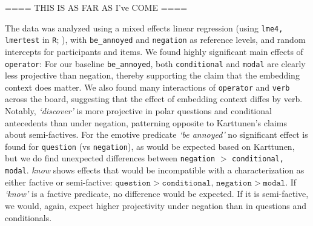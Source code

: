 \documentclass[12pt, a4paper]{scrartcl}
\begin{document}
==== THIS IS AS FAR AS I've COME ====


	\noindent The data was analyzed using a mixed effects linear regression (using \texttt{lme4, lmertest} in \texttt{R}; \citealp{bates_fitting_2015,kuznetsova_lmertest_2016,r_core_team_r_2014}), with \texttt{be\_annoyed} and \texttt{negation} as reference levels, and random intercepts for participants and items.
	We found highly significant main effects of \texttt{operator}: For our baseline \texttt{be\_annoyed}, both \texttt{conditional} and \texttt{modal} are clearly less projective than negation, thereby supporting the claim that the embedding context does matter. We also found many interactions of \texttt{operator} and \texttt{verb} across the board, suggesting that the effect of embedding context diffes by verb. Notably, \emph{\lq discover\rq} is more projective in polar questions and conditional antecedents than under negation, patterning opposite to Karttunen's claims about semi-factives. For the emotive predicate \emph{\lq be annoyed\rq} no significant effect is found for \texttt{question} (vs \texttt{negation}), as would be expected based on Karttunen, but we do find unexpected differences between \texttt{negation} $>$ \texttt{conditional, modal}. \emph{know} shows effects that would be incompatible with a characterization as either factive or semi-factive: $\texttt{question} > \texttt{conditional, negation} > \texttt{modal}$. If \emph{\lq know\rq} is a factive predicate, no difference would be expected. If it is semi-factive, we would, again, expect higher projectivity under negation than in questions and conditionals.
	
\end{document}
